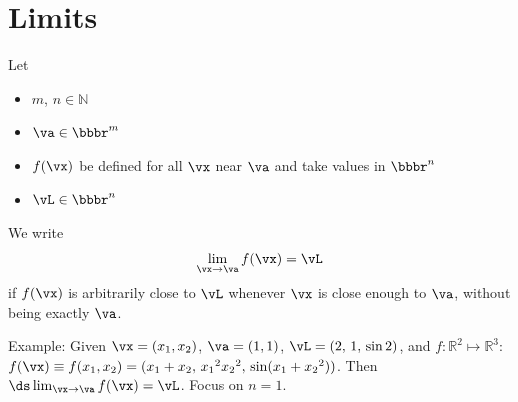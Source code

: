 \section{Limits}\label{sec limits}
\begin{defn}[Limit]\label{def limit}
Let
\begin{itemize}\itemsep1pt \parskip0pt 
\item[$\circ$]
$m$, $n\in\mathbb{N}$ %
\item[$\circ$]
$\va\in\bbbr^m$
\item[$\circ$]
$f(\vx)$ be defined for all $\vx$ near %
$\va$ and take values in $\bbbr^n$
\item[$\circ$]
$\vL\in\bbbr^n$
\end{itemize}
We write
\begin{align*}
\lim_{\vx\to \va} f(\vx) = \vL
\end{align*}
if %
$f(\vx)$ is arbitrarily close to $\vL$ whenever $\vx$ is close enough to $\va$,
without %
being exactly $\va$.
\end{defn}
Example: Given $\vx = (x_1, x_2)$, $\va = (1, 1)$, $\vL = (2,\,1,\,\sin 2)$, and $f:\mathbb{R}^2\mapsto\mathbb{R}^3$: $f(\vx)\equiv f(x_1, x_2) = (x_1 + x_2,\,{x_1}^2{x_2}^2,\,\sin(x_1 + {x_2}^2))$. Then $\ds\lim_{\vx\to \va} f(\vx) = \vL$.
Focus on $n = 1$.

